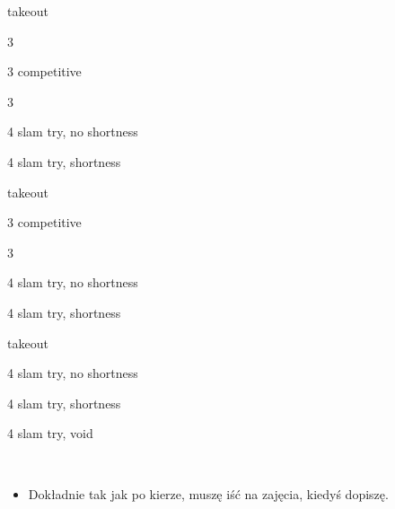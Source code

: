 \documentclass[12pt, a4paper]{article}
\begin{document}
\sequence{{1\hearts}{(3\clubs)}}
\begin{options}[1]
    \item[\dbl] takeout \gf
    \item[3\diams] \then\ \hearts\ \invp
    \item[3\hearts] competitive
    \item[3\spades] \spades\ \gf
    \item[4\clubs] slam try, no shortness
    \item[4\diams] slam try, shortness
\end{options}

\sequence{{1\hearts}{(3\diams)}}
\begin{options}[1]
    \item[\dbl] takeout \gf
    \item[3\hearts] competitive
    \item[3\spades] \spades\ \gf
    \item[4\clubs] slam try, no shortness
    \item[4\diams] slam try, shortness
\end{options}

\sequence{{1\hearts}{(3\spades)}}
\begin{options}[1]
    \item[\dbl] takeout \gf
    \item[4\clubs] slam try, no shortness
    \item[4\diams] slam try, shortness
    \item[4\spades] slam try, void 
\end{options}

\vspace{2cm}
{\Huge{\spades}}\\
\begin{itemize}
    \item Dokładnie tak jak po kierze, muszę iść na zajęcia, kiedyś dopiszę.
\end{itemize}
\end{document}
